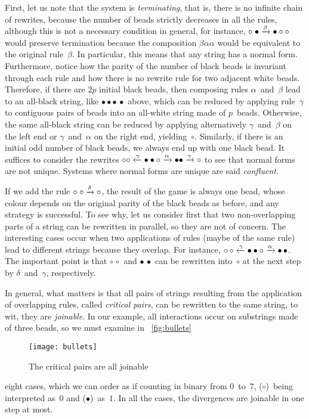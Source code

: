 First, let us note that the system is
\emph{terminating}, that is, there is no infinite
chain of rewrites, because the number of beads strictly decreases in
all the rules, although this is not a necessary condition in general,
for instance, \(\circ \; \bullet \xrightarrow{\smash{\beta}} \bullet
\circ \circ\) would preserve termination because the composition
\(\beta\alpha\alpha\) would be equivalent to the original
rule~\(\beta\). In particular, this means that any string has a normal
form. Furthermore, notice how the parity of the number of black beads
is invariant through each rule and how there is no rewrite rule for
two adjacent white beads. Therefore, if there are \(2p\) initial black
beads, then composing rules \(\alpha\)~and~\(\beta\) lead to an
all\hyp{}black string, like \(\bullet \bullet \bullet \, \bullet\)
above, which can be reduced by applying rule~\(\gamma\) to contiguous
pairs of beads into an all\hyp{}white string made of
\(p\)~beads. Otherwise, the same all\hyp{}black string can be reduced
by applying alternatively \(\gamma\)~and~\(\beta\) on the left end or
\(\gamma\)~and~\(\alpha\) on the right end,
yielding~\(\circ\). Similarly, if there is an initial odd number of
black beads, we always end up with one black bead. It suffices to
consider the rewrites \(\circ \circ \xleftarrow{\smash{\gamma}}
\bullet \bullet \circ \xrightarrow{\smash{\alpha}} \bullet \bullet
\xrightarrow{\smash{\gamma}} \circ\) to see that normal forms are not
unique. Systems where normal forms are unique are said
\emph{confluent}.

If we add the rule \(\circ\; \circ \xrightarrow{\smash{\delta}}
\circ\), the result of the game is always one bead, whose colour
depends on the original parity of the black beads as before, and any
strategy is successful. To see why, let us consider first that two
non\hyp{}overlapping parts of a string can be rewritten in parallel,
so they are not of concern. The interesting cases occur when two
applications of rules (maybe of the same rule) lead to different
strings because they overlap. For instance, \(\circ \, \circ
\xleftarrow{\smash{\gamma}} \bullet \bullet \circ
\xrightarrow{\smash{\alpha}} \bullet \, \bullet\). The important point
is that \(\circ \, \circ\) and \(\bullet \, \bullet\) can be rewritten
into~\(\circ\) at the next step by \(\delta\)~and~\(\gamma\),
respectively.

In general, what matters is that all pairs of strings resulting from
the application of overlapping rules, called \emph{critical
  pairs}, can be rewritten to the
same string, to wit, they are \emph{joinable}. In our example, all
interactions occur on substrings made of three beads, so we must
examine in \fig~\vref{fig:bullets}
\begin{figure}[b]
\centering
\texttt{[image: bullets]}
\caption{The critical pairs are all joinable\label{fig:bullets}}
\end{figure}
eight cases, which we can order as if counting in binary from
\(0\)~to~\(7\), (\(\circ\))~being interpreted as~\(0\) and
(\(\bullet\))~as~\(1\). In all the cases, the divergences are joinable
in one step at most.


